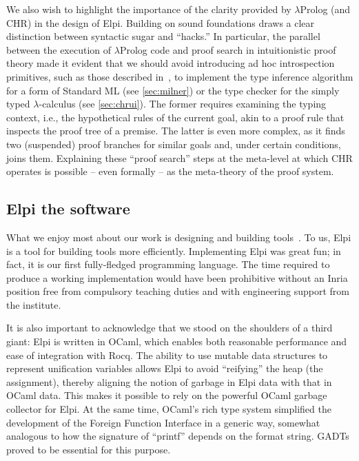 \documentclass[a4paper, 11pt]{book}
\begin{document}
We also wish to highlight the importance of the clarity provided by
$\lambda$Prolog (and CHR) in the design of Elpi. Building on sound foundations
draws a clear distinction between syntactic sugar and ``hacks.'' In particular,
the parallel between the execution of $\lambda$Prolog code and proof search in
intuitionistic proof theory made it evident that we should avoid introducing ad
hoc introspection primitives, such as those described in~\cite[Section 8 and
later]{10.1145/3236788}, to implement the type inference algorithm for a form
of Standard ML (see \cref{sec:milner}) or the type checker for the
simply typed $\lambda$-calculus (see \cref{sec:chrui}). The former
requires examining the typing context, i.e., the hypothetical rules of the
current goal, akin to a proof rule that inspects the proof tree of a premise.
The latter is even more complex, as it finds two (suspended) proof branches for
similar goals and, under certain conditions, joins them. Explaining these
``proof search'' steps at the meta-level at which CHR operates is possible -- even
formally -- as the meta-theory of the proof system.


\subsection{Elpi the software}


What we enjoy most about our work is designing and building tools~\cite{DBLP:journals/jar/AspertiCTZ07,gonthier:inria-00258384,Coq-refman}.
To us, Elpi is a tool for building tools more efficiently. Implementing Elpi was great fun; in fact, it is our first fully-fledged programming language. The time required to produce a working implementation would have been prohibitive without an Inria position free from compulsory teaching duties and with engineering support from the institute. %

It is also important to acknowledge that we stood on the shoulders of a third giant: Elpi is written in OCaml, which enables both reasonable performance and ease of integration with Rocq. The ability to use mutable data structures to represent unification variables allows Elpi to avoid ``reifying'' the heap (the assignment), thereby aligning the notion of garbage in Elpi data with that in OCaml data. This makes it possible to rely on the powerful OCaml garbage collector for Elpi. At the same time, OCaml's rich type system simplified the development of the Foreign Function Interface in a generic way, somewhat analogous to how the signature of ``printf'' depends on the format string. GADTs proved to be essential for this purpose.
\end{document}

